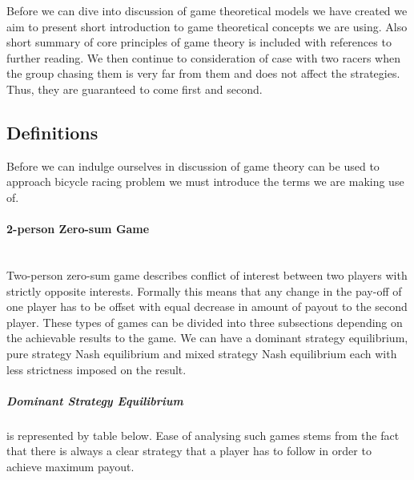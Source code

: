 \documentclass[10pt, a4paper]{report}
\begin{document}
Before we can dive into discussion of game theoretical models we have created we aim to present short introduction to game theoretical concepts we are using. Also short summary of core principles of game theory is included with references to further reading. We then continue to consideration of case with two racers when the group chasing them is very far from them and does not affect the strategies. Thus, they are guaranteed to come first and second.

\subsection{Definitions}\label{subsec:defs}

Before we can indulge ourselves in discussion of game theory can be used to approach bicycle racing problem we must introduce the terms we are making use of.

\paragraph{2-person Zero-sum Game} ~\\
Two-person zero-sum game describes conflict of interest between two players with strictly opposite interests. Formally this means that any change in the pay-off of one player has to be offset with equal decrease in amount of payout to the second player. These types of games can be divided into three subsections depending on the achievable results to the game. We can have a dominant strategy equilibrium, pure strategy Nash equilibrium and mixed strategy Nash equilibrium each with less strictness imposed on the result.
\subparagraph{Dominant Strategy Equilibrium}
is represented by table below. Ease of analysing such games stems from the fact that there is always a clear strategy that a player has to follow in order to achieve maximum payout.

\end{document}
